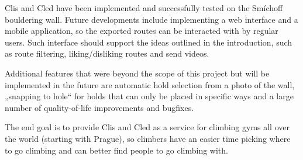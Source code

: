 
Clis and Cled have been implemented and successfully tested on the Smíchoff bouldering wall.
Future developments include implementing a web interface and a mobile application, so the exported routes can be interacted with by regular users.
Such interface should support the ideas outlined in the introduction, such as route filtering, liking/disliking routes and send videos.

Additional features that were beyond the scope of this project but will be implemented in the future are automatic hold selection from a photo of the wall, „snapping to hole“ for holds that can only be placed in specific ways and a large number of quality-of-life improvements and bugfixes.

The end goal is to provide Clis and Cled as a service for climbing gyms all over the world (starting with Prague), so climbers have an easier time picking where to go climbing and can better find people to go climbing with.
